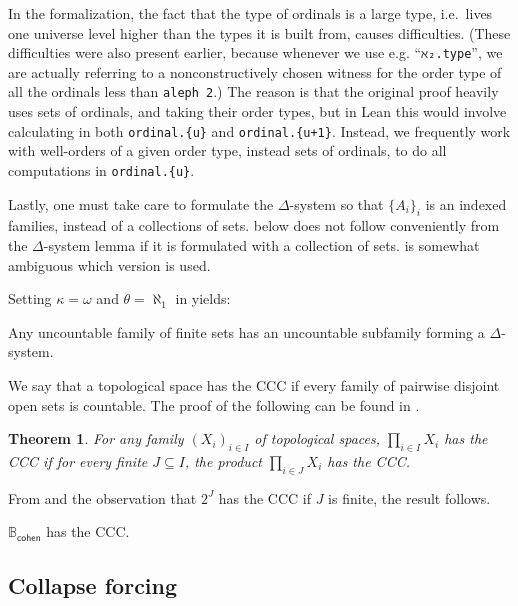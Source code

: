 \documentclass[sigplan,10pt,review]{acmart}
\newcommand{\B}{\mathbb{B}}
\newcommand{\lil}{\lstinline}
\newtheorem{thm}{Theorem}[section]
\theoremstyle{definition}
\begin{document}
In the formalization, the fact that the type of ordinals is a large type, i.e.\ lives one universe level higher than the types it is built from, causes difficulties. (These difficulties were also present earlier, because whenever we use e.g. ``\lil{ℵ₂.type}'', we are actually referring to a nonconstructively chosen witness for the order type of all the ordinals less than \lil{aleph 2}.)
The reason is that the original proof heavily uses sets of ordinals, and taking their order types, but in Lean this would involve calculating in both \lstinline"ordinal.{u}" and \lstinline"ordinal.{u+1}".
Instead, we frequently work with well-orders of a given order type, instead sets of ordinals, to do all computations in \lstinline"ordinal.{u}".

Lastly, one must take care to formulate the $\Delta$-system so that $\{A_i\}_i$ is an indexed families, instead of a collections of sets.
 below does not follow conveniently from the $\Delta$-system lemma if it is formulated with a collection of sets.
\cite{kunen2014set} is somewhat ambiguous which version is used.

Setting \(\kappa = \omega\) and \(\theta = \aleph_1\) in  yields:
\begin{lemma}\label{lemma:delta-system-lemma:simple}
  Any uncountable family of finite sets has an uncountable subfamily forming a $\Delta$-system.
\end{lemma}
We say that a topological space has the CCC if every family of pairwise disjoint open sets is countable. The proof of the following can be found in \cite{DBLP:conf/itp/HanD19}.
\begin{thm}\label{thm:product-ccc}
  For any family $(X_i)_{i\in I}$ of topological spaces, $\prod_{i\in I} X_i$ has the CCC if for every finite $J\subseteq I$, the product $\prod_{i\in J} X_i$ has the CCC.
\end{thm}
From  and the observation that $2^J$ has the CCC if $J$ is finite, the result follows.
\begin{lemma}\label{lemma:cohen-algebra-CCC}
  \(\B_{\mathsf{cohen}}\) has the CCC.
\end{lemma}

\subsection{Collapse forcing} \label{subsect:collapse}
\end{document}
